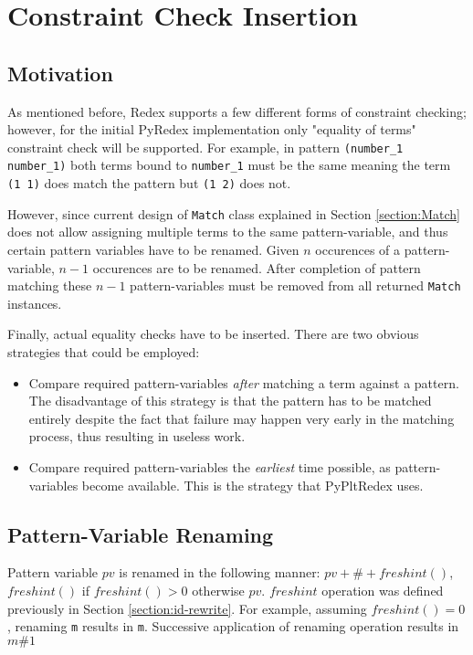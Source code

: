 \section{Constraint Check Insertion}
\label{section:constraint-check}
\subsection{Motivation}
As mentioned before, Redex supports a few different forms of constraint checking; however, for the initial PyRedex implementation only "equality of terms" constraint check will be supported. For example, in pattern \texttt{(number\_1 number\_1)} both terms bound to \texttt{number\_1} must be the same meaning the term \texttt{(1 1)} does match the pattern but \texttt{(1 2)} does not. 

However, since current design of \texttt{Match} class explained in Section \ref{section:Match} does not allow assigning multiple terms to the same pattern-variable, and thus certain pattern variables have to be renamed. Given $n$ occurences of a pattern-variable, $n-1$ occurences are to be renamed. After completion of pattern matching these $n-1$ pattern-variables must be removed from all returned \texttt{Match} instances.

Finally, actual equality checks have to be inserted. There are two obvious strategies that could be employed:

\begin{itemize}
\item Compare required pattern-variables \textit{after} matching a term against a pattern. The disadvantage of this strategy is that the pattern has to be matched entirely despite the fact that failure may happen very early in the matching process, thus resulting in useless work.

\item Compare required pattern-variables the \textit{earliest} time possible, as pattern-variables become available. This is the strategy that PyPltRedex uses.
\end{itemize}

\subsection{Pattern-Variable Renaming}
Pattern variable $pv$ is renamed in the following manner: $pv + \# + freshint()$, $freshint()$ if $freshint() > 0$ otherwise $pv$. $freshint$ operation was defined previously in Section \ref{section:id-rewrite}. For example, assuming $freshint()=0$, renaming \texttt{m} results in \texttt{m}. Successive application of renaming operation results in \texttt{$m\#1$}

